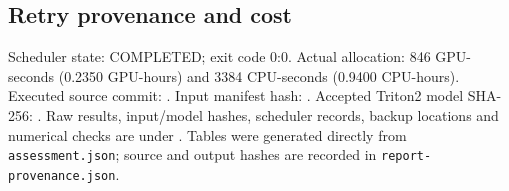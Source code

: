 \subsection*{Retry provenance and cost}
Scheduler state: COMPLETED; exit code 0:0.
Actual allocation: 846 GPU-seconds (0.2350 GPU-hours)
and 3384 CPU-seconds (0.9400 CPU-hours).
Executed source commit: .
Input manifest hash: .
Accepted Triton2 model SHA-256: .
Raw results, input/model hashes, scheduler records, backup locations and numerical
checks are under .
Tables were generated directly from \texttt{assessment.json}; source and output
hashes are recorded in \texttt{report-provenance.json}.
